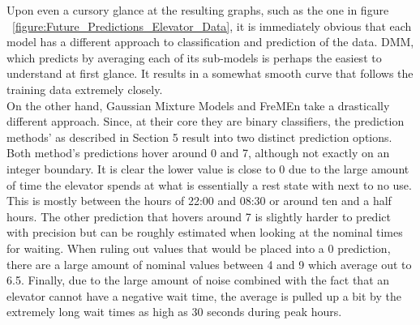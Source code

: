 \begin{center}
Upon even a cursory glance at the resulting graphs, such as the one in figure
~\ref{figure:Future_Predictions_Elevator_Data}, it is immediately
obvious that each model has a different approach to classification and
prediction of the data. DMM, which predicts by
averaging each of its sub-models is perhaps the easiest to understand at first
glance. It results in a somewhat smooth curve that follows the training data
extremely closely. \\

On the other hand, Gaussian Mixture Models and FreMEn take a drastically
different approach. Since, at their core they are binary classifiers, the
prediction methods' as described in Section 5 result into two distinct
prediction options. Both method's predictions hover around 0 and 7, although
not exactly on an integer boundary. It is clear the lower value is close to 0
due to the large amount of time the elevator spends at what is essentially a
rest state with next to no use. This is mostly between the hours of 22:00 and
08:30 or around ten and a half hours. The other prediction that hovers around 7
is slightly harder to predict with precision but can be roughly estimated when
looking at the nominal times for waiting. When ruling out values that would be
placed into a 0 prediction, there are a large amount of nominal values between 4
and 9 which average out to 6.5. Finally, due to the large amount of noise
combined with the fact that an elevator cannot have a negative wait time,
the average is pulled up a bit by the extremely long wait times as high as 30 seconds during peak hours. \\


\end{center}
